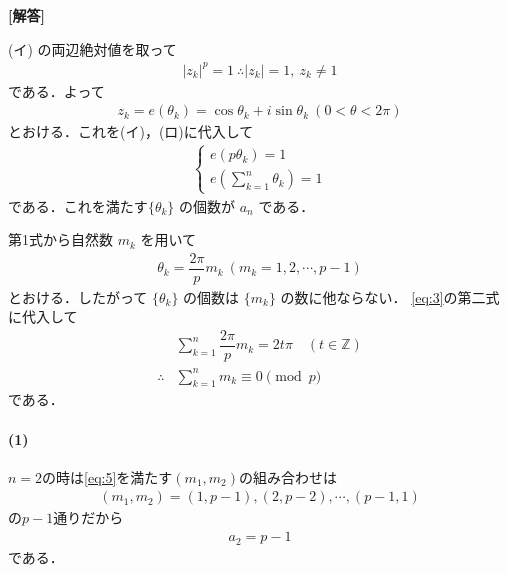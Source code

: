 \documentclass[../../main.tex]{subfiles}
\begin{document}
\begin{oframed}
  
\end{oframed}

{\bf [解答]}

(イ) の両辺絶対値を取って
\begin{align}
  |z_k|^p = 1 \ \therefore |z_k| = 1, \ z_k \neq 1 \label{eq:1}
\end{align}
である．よって
\begin{align}
  z_k = e(\theta_k) = \cos\theta_k + i\sin\theta_k \ (0 < \theta < 2\pi) \label{eq:2}
\end{align}
とおける．これを(イ)，(ロ)に代入して
\begin{align}
  \begin{cases}
    e(p\theta_k) = 1 \\
    e(\sum_{k=1}^{n}\theta_k) = 1
  \end{cases} \label{eq:3}
\end{align}
である．これを満たす$\{\theta_k\}$ の個数が $a_n$ である．

第1式から自然数 $m_k$ を用いて
\begin{align}
  \theta_k = \dfrac{2\pi}{p}m_k\ (m_k = 1, 2, \cdots, p-1) \label{eq:4}
\end{align}
とおける．したがって $\{\theta_k\}$ の個数は $\{m_k\}$ の数に他ならない．
\cref{eq:3}の第二式に代入して
\begin{align}
  & \sum_{k=1}^{n} \dfrac{2\pi}{p}m_k = 2t\pi \quad (t\in\mathbb{Z}) \\
  \therefore
  & \sum_{k=1}^{n} m_k \equiv 0 \pmod p \label{eq:5}
\end{align}
である．

\paragraph{(1)}

$n=2$の時は\cref{eq:5}を満たす$(m_1,m_2)$の組み合わせは
\begin{align}
  (m_1,m_2) = (1,p-1), (2,p-2), \cdots, (p-1,1)
\end{align}
の$p-1$通りだから
\begin{align}
  a_2 = p-1 \label{eq:6}
\end{align}
である．
\end{document}
